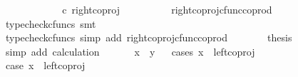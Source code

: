 \begin{isabellebody}
\ \ \ \ \isamarkupfalse%
\ \isamarkupfalse%
\ {\isachardoublequoteopen}{\isachardot}{\kern0pt}{\isachardot}{\kern0pt}{\isachardot}{\kern0pt}\ {\isacharequal}{\kern0pt}\ {\isasymlangle}{\isasymt}{\isacharcomma}{\kern0pt}{\isasymf}{\isasymrangle}\ {\isasymamalg}\ {\isasymlangle}{\isasymf}{\isacharcomma}{\kern0pt}{\isasymt}{\isasymrangle}\ {\isasymcirc}\isactrlsub c\ right{\isacharunderscore}{\kern0pt}coproj\ {\isasymone}\ {\isasymone}{\isachardoublequoteclose}\isanewline
\ \ \ \ \ \ \isamarkupfalse%
\ right{\isacharunderscore}{\kern0pt}coproj{\isacharunderscore}{\kern0pt}cfunc{\isacharunderscore}{\kern0pt}coprod\ \isamarkupfalse%
\ {\isacharparenleft}{\kern0pt}typecheck{\isacharunderscore}{\kern0pt}cfuncs{\isacharcomma}{\kern0pt}\ smt{\isacharparenright}{\kern0pt}\isanewline
\ \ \ \ \isamarkupfalse%
\ \isamarkupfalse%
\ {\isachardoublequoteopen}{\isachardot}{\kern0pt}{\isachardot}{\kern0pt}{\isachardot}{\kern0pt}\ {\isacharequal}{\kern0pt}\ {\isasymlangle}{\isasymf}{\isacharcomma}{\kern0pt}{\isasymt}{\isasymrangle}{\isachardoublequoteclose}\isanewline
\ \ \ \ \ \ \isamarkupfalse%
\ {\isacharparenleft}{\kern0pt}typecheck{\isacharunderscore}{\kern0pt}cfuncs{\isacharcomma}{\kern0pt}\ simp\ add{\isacharcolon}{\kern0pt}\ right{\isacharunderscore}{\kern0pt}coproj{\isacharunderscore}{\kern0pt}cfunc{\isacharunderscore}{\kern0pt}coprod{\isacharparenright}{\kern0pt}\isanewline
\ \ \ \ \isamarkupfalse%
\ \isamarkupfalse%
\ {\isacharquery}{\kern0pt}thesis\isanewline
\ \ \ \ \ \ \isamarkupfalse%
\ {\isacharparenleft}{\kern0pt}simp\ add{\isacharcolon}{\kern0pt}\ calculation{\isacharparenright}{\kern0pt}\isanewline
\ \ \isamarkupfalse%
\isanewline
\ \ \isamarkupfalse%
\ {\isachardoublequoteopen}x\ {\isacharequal}{\kern0pt}\ y{\isachardoublequoteclose}\isanewline
\ \ \isamarkupfalse%
{\isacharparenleft}{\kern0pt}cases\ {\isachardoublequoteopen}x\ {\isacharequal}{\kern0pt}\ left{\isacharunderscore}{\kern0pt}coproj\ {\isasymone}\ {\isacharparenleft}{\kern0pt}{\isasymone}\ {\isasymCoprod}\ {\isasymone}{\isacharparenright}{\kern0pt}{\isachardoublequoteclose}{\isacharparenright}{\kern0pt}\isanewline
\ \ \ \ \isamarkupfalse%
\ case{}{\isacharcolon}{\kern0pt}\ {\isachardoublequoteopen}x\ {\isacharequal}{\kern0pt}\ left{\isacharunderscore}{\kern0pt}coproj\ {\isasymone}\ {\isacharparenleft}{\kern0pt}{\isasymone}\ {\isasymCoprod}\ {\isasymone}{\isacharparenright}{\kern0pt}{\isachardoublequoteclose}\isanewline

\end{isabellebody}
